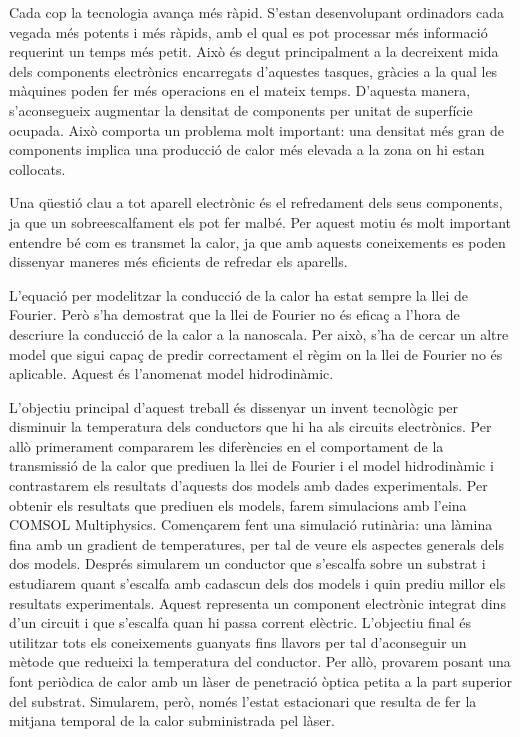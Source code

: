 \documentclass{article}
\begin{document}
Cada cop la tecnologia avan\c{c}a m\'{e}s r\`{a}pid. S'estan desenvolupant ordinadors cada vegada m\'{e}s potents i m\'{e}s r\`{a}pids, amb el qual es pot processar m\'{e}s informaci\'{o} requerint un temps m\'{e}s petit. Aix\`{o} \'{e}s degut principalment a la decreixent mida dels components electr\`{o}nics encarregats d'aquestes tasques, gr\`{a}cies a la qual les m\`{a}quines poden fer m\'{e}s operacions en el mateix temps. D'aquesta manera, s'aconsegueix augmentar la densitat de components per unitat de superf\'{i}cie ocupada. Aix\`{o} comporta un problema molt important: una densitat m\'{e}s gran de components implica una producci\'{o} de calor m\'{e}s elevada a la zona on hi estan col\textperiodcentered locats.

Una q\"{u}esti\'{o} clau a tot aparell electr\`{o}nic \'{e}s el refredament dels seus components, ja que un sobreescalfament els pot fer malb\'{e}. Per aquest motiu \'{e}s molt important entendre b\'{e} com es transmet la calor, ja que amb aquests coneixements es poden dissenyar maneres m\'{e}s eficients de refredar els aparells.
\vspace{4mm}

L'equaci\'{o} per modelitzar la conducci\'{o} de la calor ha estat sempre la llei de Fourier. Per\`{o} s'ha demostrat que la llei de Fourier no \'{e}s efica\c{c} a l'hora de descriure la conducci\'{o} de la calor a la nanoscala. Per aix\`{o}, s'ha de cercar un altre model que sigui capa\c{c} de predir correctament el r\`{e}gim on la llei de Fourier no \'{e}s aplicable. Aquest \'{e}s l'anomenat model hidrodin\`{a}mic.

L'objectiu principal d'aquest treball \'{e}s dissenyar un invent tecnol\`{o}gic per disminuir la temperatura dels conductors que hi ha als circuits electr\`{o}nics. Per all\`{o} primerament compararem les difer\`{e}ncies en el comportament de la transmissi\'{o} de la calor que prediuen la llei de Fourier i el model hidrodin\`{a}mic i contrastarem els resultats d'aquests dos models amb dades experimentals. Per obtenir els resultats que prediuen els models, farem simulacions amb l'eina COMSOL Multiphysics. Comen\c{c}arem fent una simulaci\'{o} rutin\`{a}ria: una l\`{a}mina fina amb un gradient de temperatures, per tal de veure els aspectes generals dels dos models. Despr\'{e}s simularem un conductor que s'escalfa sobre un substrat i estudiarem quant s'escalfa amb cadascun dels dos models i quin prediu millor els resultats experimentals. Aquest representa un component electr\`{o}nic integrat dins d'un circuit i que s'escalfa quan hi passa corrent el\`{e}ctric. L'objectiu final \'{e}s utilitzar tots els coneixements guanyats fins llavors per tal d'aconseguir un m\`{e}tode que redueixi la temperatura del conductor. Per all\`{o}, provarem posant una font peri\`{o}dica de calor amb un l\`{a}ser de penetraci\'{o} \`{o}ptica petita a la part superior del substrat. Simularem, per\`{o}, nom\'{e}s l'estat estacionari que resulta de fer la mitjana temporal de la calor subministrada pel l\`{a}ser.
\end{document}
